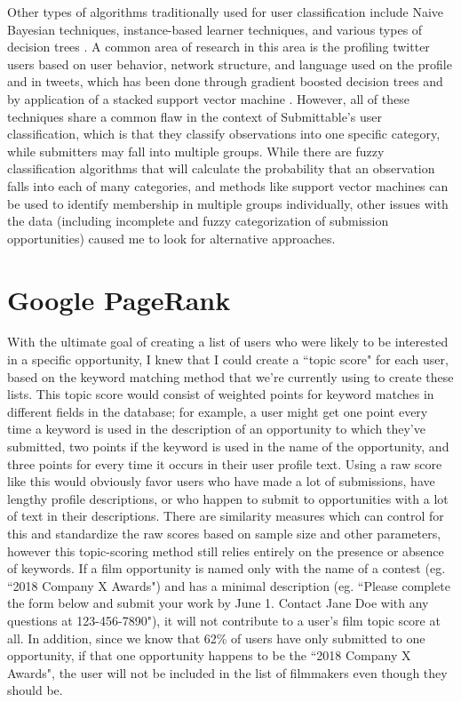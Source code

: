 \documentclass[]{report}   %
\begin{document}
Other types of algorithms traditionally used for user classification include Naive Bayesian techniques, instance-based learner techniques,  and various types of decision trees \cite{cufoglu_lohi_madani_2009}. A common area of research in this area is the profiling twitter users based on user behavior, network structure, and language used on the profile and in tweets, which has been done through gradient boosted decision trees \cite{pennacchiotti_popescu_2011} and by application of a stacked support vector machine \cite{rao_yarowsky_shreevats_gupta_2010}. However, all of these techniques share a common flaw in the context of Submittable's user classification, which is that they classify observations into one specific category, while submitters may fall into multiple groups. While there are fuzzy classification algorithms that will calculate the probability that an observation falls into each of many categories, and methods like support vector machines can be used to identify membership in multiple groups individually, other issues with the data (including incomplete and fuzzy categorization of submission opportunities) caused me to look for alternative approaches.

\section{Google PageRank}

With the ultimate goal of creating a list of users who were likely to be interested in a specific opportunity, I knew that I could create a ``topic score" for each user, based on the keyword matching method that we're currently using to create these lists. This topic score would consist of weighted points for keyword matches in different fields in the database; for example, a user might get one point every time a keyword is used in the description of an opportunity to which they've submitted, two points if the keyword is used in the name of the opportunity, and three points for every time it occurs in their user profile text. Using a raw score like this would obviously favor users who have made a lot of submissions, have lengthy profile descriptions, or who happen to submit to opportunities with a lot of text in their descriptions. There are similarity measures which can control for this and standardize the raw scores based on sample size and other parameters, however this topic-scoring method still relies entirely on the presence or absence of keywords. If a film opportunity is named only with the name of a contest (eg. ``2018 Company X Awards") and has a minimal description (eg. ``Please complete the form below and submit your work by June 1. Contact Jane Doe with any questions at 123-456-7890"), it will not contribute to a user's film topic score at all. In addition, since we know that 62\% of users have only submitted to one opportunity, if that one opportunity happens to be the ``2018 Company X Awards", the user will not be included in the list of filmmakers even though they should be.
\end{document}
